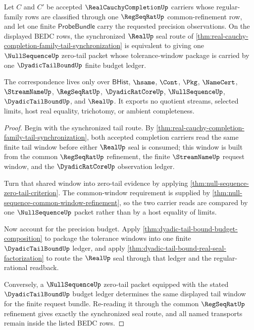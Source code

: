 \begin{theorem}
\label{thm:real-cauchy-completion-null-tail-budget-correspondence}
Let $C$ and $C'$ be accepted $\RealCauchyCompletionUp$ carriers whose regular-family rows are classified through one $\RegSeqRatUp$ common-refinement row, and let one finite $\mathsf{ProbeBundle}$ carry the requested precision observations. On the displayed BEDC rows, the synchronized $\RealUp$ seal route of \autoref{thm:real-cauchy-completion-family-tail-synchronization} is equivalent to giving one $\NullSequenceUp$ zero-tail packet whose tolerance-window package is carried by one $\DyadicTailBoundUp$ finite budget ledger.

The correspondence lives only over $\mathsf{BHist}$, $\hsame$, $\Cont$, $\Pkg$, $\NameCert$, $\StreamNameUp$, $\RegSeqRatUp$, $\DyadicRatCoreUp$, $\NullSequenceUp$, $\DyadicTailBoundUp$, and $\RealUp$. It exports no quotient streams, selected limits, host real equality, trichotomy, or ambient completeness.
\end{theorem}
\begin{proof}
Begin with the synchronized tail route. By \autoref{thm:real-cauchy-completion-family-tail-synchronization}, both accepted completion carriers read the same finite tail window before either $\RealUp$ seal is consumed; this window is built from the common $\RegSeqRatUp$ refinement, the finite $\StreamNameUp$ request window, and the $\DyadicRatCoreUp$ observation ledger.

Turn that shared window into zero-tail evidence by applying \autoref{thm:null-sequence-zero-tail-criterion}. The common-window requirement is supplied by \autoref{thm:null-sequence-common-window-refinement}, so the two carrier reads are compared by one $\NullSequenceUp$ packet rather than by a host equality of limits.

Now account for the precision budget. Apply \autoref{thm:dyadic-tail-bound-budget-composition} to package the tolerance windows into one finite $\DyadicTailBoundUp$ ledger, and apply \autoref{thm:dyadic-tail-bound-real-seal-factorization} to route the $\RealUp$ seal through that ledger and the regular-rational readback.

Conversely, a $\NullSequenceUp$ zero-tail packet equipped with the stated $\DyadicTailBoundUp$ budget ledger determines the same displayed tail window for the finite request bundle. Re-reading it through the common $\RegSeqRatUp$ refinement gives exactly the synchronized seal route, and all named transports remain inside the listed BEDC rows.
\end{proof}

